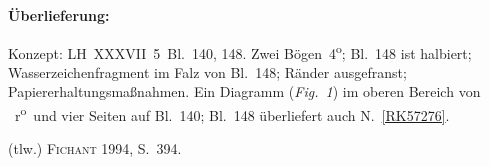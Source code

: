 %  
%
%
%
%
%
%
%
%
%
\frenchspacing
%
\begin{ledgroupsized}[r]{120mm}
\footnotesize
\pstart
\noindent\textbf{Überlieferung:}
\pend
\end{ledgroupsized}
%
\begin{ledgroupsized}[r]{114mm}
\footnotesize
\pstart \parindent -6mm
%
Konzept:
LH~XXXVII~5~Bl.~140, 148. 
Zwei Bögen~4\textsuperscript{o};
Bl.~148 ist halbiert; Wasserzeichenfragment im Falz von Bl.~148;
Ränder ausgefranst; Papiererhaltungsmaßnahmen.
Ein Diagramm (\lbrack\textit{Fig.~1}\rbrack) im oberen Bereich von ~r\textsuperscript{o}\rbrack\
und vier Seiten auf Bl.~140;
Bl.~148 überliefert auch N.~\ref{RK57276}.
\pend
\end{ledgroupsized}
%
\begin{ledgroupsized}[r]{114mm}
\footnotesize
\pstart
\parindent -6mm
%
(tlw.) \textsc{Fichant} 1994, S.~394\cite{01056}.
\pend%
\end{ledgroupsized}
%
%
\vspace{5mm}
